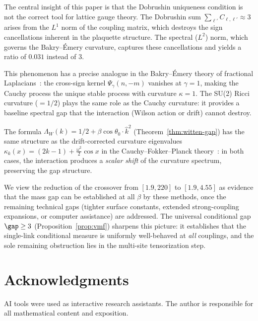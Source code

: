 \documentclass[11pt,a4paper]{article}
\theoremstyle{plain}
\theoremstyle{definition}
\theoremstyle{remark}
\newcommand{\khat}{\hat{k}}
\begin{document}
The central insight of this paper is that the Dobrushin uniqueness
condition is not the correct tool for lattice gauge theory.
The Dobrushin sum $\sum_{\ell'} C_{\ell,\ell'} \approx 3$
arises from the $L^1$ norm of the coupling matrix, which destroys
the sign cancellations inherent in the plaquette structure.
The spectral ($L^2$) norm, which governs the Bakry--\'Emery
curvature, captures these cancellations and yields a ratio
of $0.031$ instead of $3$.

This phenomenon has a precise analogue in the
Bakry--\'Emery theory of fractional
Laplacians~\cite{Fontes2026b}: the cross-sign kernel
$\Psi_\gamma(n, -m)$ vanishes at $\gamma = 1$, making the
Cauchy process the unique stable process with curvature $\kappa = 1$.
The SU(2) Ricci curvature ($= 1/2$) plays the same role as the
Cauchy curvature: it provides a baseline spectral gap that the
interaction (Wilson action or drift) cannot destroy.

The formula $\Lambda_W(k) = 1/2 + \beta\cos\theta_0 \cdot \khat^2$
(Theorem~\ref{thm:witten-gap}) has the same structure as the
drift-corrected curvature eigenvalues
$\kappa_k(x) = (2k-1) + \frac{\omega^2}{2}\cos x$ in the
Cauchy--Fokker--Planck theory~\cite{Fontes2026b}: in both cases,
the interaction produces a \emph{scalar shift} of the curvature
spectrum, preserving the gap structure.

We view the reduction of the crossover from $[1.9, 220]$ to
$[1.9, 4.55]$ as evidence that the mass gap can be established
at all $\beta$ by these methods, once the remaining technical
gaps (tighter surface constants, extended strong-coupling
expansions, or computer assistance) are addressed.
The universal conditional gap $\gap \geq 3$
(Proposition~\ref{prop:vmf}) sharpens this picture: it
establishes that the single-link conditional measure is uniformly
well-behaved at \emph{all} couplings, and the sole remaining
obstruction lies in the multi-site tensorization step.


\section*{Acknowledgments}
AI tools were used as interactive research assistants.
The author is responsible for all mathematical content
and exposition.
\end{document}
